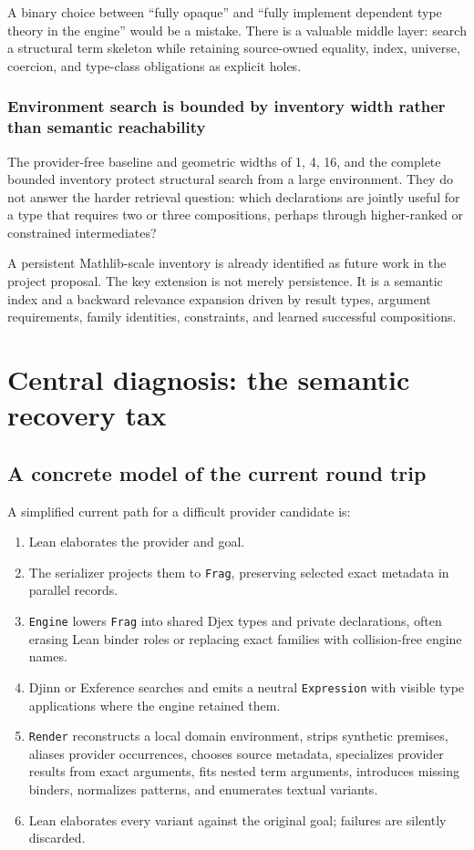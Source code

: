 \documentclass[11pt]{article}
\newcommand{\code}[1]{\texttt{#1}}
\newcommand{\Djex}{\textsf{Djex}}
\newcommand{\Djinn}{Djinn}
\newcommand{\Exference}{Exference}
\begin{document}
A binary choice between ``fully opaque'' and ``fully implement dependent type
theory in the engine'' would be a mistake.  There is a valuable middle layer:
search a structural term skeleton while retaining source-owned equality,
index, universe, coercion, and type-class obligations as explicit holes.

\subsubsection{Environment search is bounded by inventory width rather than
semantic reachability}

The provider-free baseline and geometric widths of 1, 4, 16, and the complete
bounded inventory protect structural search from a large environment.  They do
not answer the harder retrieval question: which declarations are jointly
useful for a type that requires two or three compositions, perhaps through
higher-ranked or constrained intermediates?

A persistent Mathlib-scale inventory is already identified as future work in
the project proposal.  The key extension is not merely persistence.  It is a
semantic index and a backward relevance expansion driven by result types,
argument requirements, family identities, constraints, and learned successful
compositions.

\section{Central diagnosis: the semantic recovery tax}
\label{sec:recovery-tax}

\subsection{A concrete model of the current round trip}

A simplified current path for a difficult provider candidate is:

\begin{enumerate}
  \item Lean elaborates the provider and goal.
  \item The serializer projects them to \code{Frag}, preserving selected exact
    metadata in parallel records.
  \item \code{Engine} lowers \code{Frag} into shared \Djex{} types and private
    declarations, often erasing Lean binder roles or replacing exact families
    with collision-free engine names.
  \item \Djinn{} or \Exference{} searches and emits a neutral
    \code{Expression} with visible type applications where the engine retained
    them.
  \item \code{Render} reconstructs a local domain environment, strips synthetic
    premises, aliases provider occurrences, chooses source metadata,
    specializes provider results from exact arguments, fits nested term
    arguments, introduces missing binders, normalizes patterns, and enumerates
    textual variants.
  \item Lean elaborates every variant against the original goal; failures are
    silently discarded.
\end{enumerate}
\end{document}
